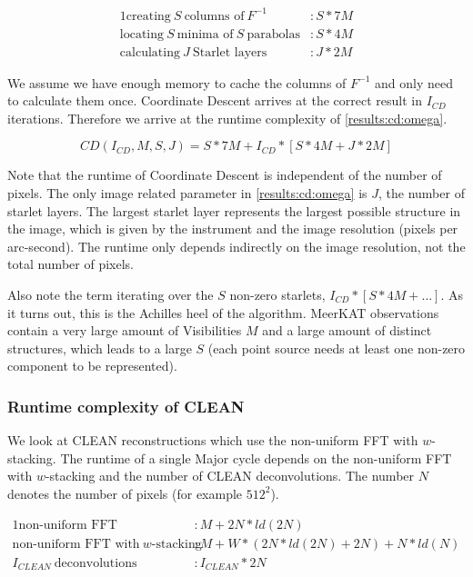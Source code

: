 \begin{alignat*}{1}
\text{creating} \:S\: \text{columns of}\: F^{-1} &: S*7M\\
\text{locating} \:S\: \text{minima of} \:S\: \text{parabolas} &: S*4M\\
\text{calculating} \:J\: \text{Starlet layers} &: J * 2M
\end{alignat*}

We assume we have enough memory to cache the columns of $F^{-1}$ and only need to calculate them once. Coordinate Descent arrives at the correct result in $I_{CD}$ iterations. Therefore we arrive at the runtime complexity of \eqref{results:cd:omega}.

\begin{equation}\label{results:cd:omega}
CD(I_{CD}, M, S, J) = S*7M + I_{CD} * [S * 4M + J * 2M]
\end{equation}

Note that the runtime of Coordinate Descent is independent of the number of pixels. The only image related parameter in \eqref{results:cd:omega} is $J$, the number of starlet layers. The largest starlet layer represents the largest possible structure in the image, which is given by the instrument and the image resolution (pixels per arc-second). The runtime only depends indirectly on the image resolution, not the total number of pixels.

Also note the term iterating over the $S$ non-zero starlets, $ I_{CD} * [S * 4M +\ldots]$. As it turns out, this is the Achilles heel of the algorithm. MeerKAT observations contain a very large amount of Visibilities $M$ and a large amount of distinct structures, which leads to a large $S$ (each point source needs at least one non-zero component to be represented). 

\subsubsection{Runtime complexity of CLEAN}
We look at CLEAN reconstructions which use the non-uniform FFT with $w$-stacking. The runtime of a single Major cycle depends on the non-uniform FFT with $w$-stacking and the number of CLEAN deconvolutions. The number $N$ denotes the number of pixels (for example $512^2$).

\begin{alignat*}{1}
	\text{non-uniform FFT} &: M + 2N*ld(2N)\\
	\text{non-uniform FFT with} \:w\text{-stacking} &:M + W*(2N*ld(2N) + 2N) + N*ld(N)\\
	I_{CLEAN}\: \text{deconvolutions} &: I_{CLEAN}*2N
\end{alignat*}

